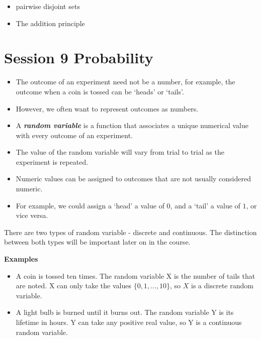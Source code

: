 \documentclass[12pt]{report}
\begin{document}
\begin{itemize}
	\item pairwise disjoint sets
	\item The addition principle
\end{itemize}


\section*{Session 9 Probability}
{ \Large
	\begin{itemize} \item The outcome of an experiment need not be a number, for example, the outcome when a coin is tossed can be `heads' or `tails'. \item
		However, we often want to represent outcomes as numbers. \item
		A \textbf{\emph{random variable}} is a function that associates a unique numerical value with every outcome of an experiment.
		\item The value of the random variable will vary from trial to trial as the experiment is repeated.
		\item Numeric values can be assigned to outcomes that are not usually considered numeric. \item For example, we could assign a `head' a value of $0$, and a `tail' a value of $1$, or vice versa.
	\end{itemize}
}
{ \Large
	There are two types of random variable - discrete and continuous. The distinction between both types will be important later on in the course.\\ \bigskip
	
	\textbf{Examples}
	\begin{itemize}
		\item A coin is tossed ten times. The random variable X is the number of tails that are noted.
		X can only take the values $\{0, 1, ..., 10\}$, so $X$ is a discrete random variable.
		\item A light bulb is burned until it burns out. The random variable Y is its lifetime in hours.
		Y can take any positive real value, so Y is a continuous random variable.
	\end{itemize}
}
\end{document}
